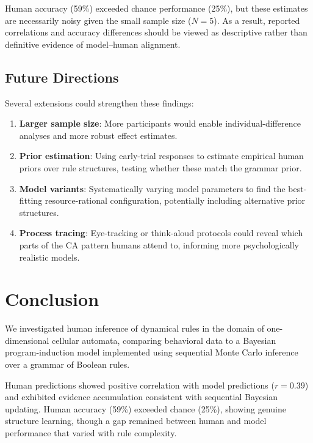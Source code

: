 \documentclass[10pt,letterpaper]{article}
\begin{document}
Human accuracy (59\%) exceeded chance performance (25\%), but these estimates are necessarily noisy given the small sample size ($N = 5$). As a result, reported correlations and accuracy differences should be viewed as descriptive rather than definitive evidence of model--human alignment.

\subsection{Future Directions}

Several extensions could strengthen these findings:

\begin{enumerate}
    \item \textbf{Larger sample size}: More participants would enable individual-difference analyses and more robust effect estimates.
    
    \item \textbf{Prior estimation}: Using early-trial responses to estimate empirical human priors over rule structures, testing whether these match the grammar prior.
    
    \item \textbf{Model variants}: Systematically varying model parameters to find the best-fitting resource-rational configuration, potentially including alternative prior structures.
    
    \item \textbf{Process tracing}: Eye-tracking or think-aloud protocols could reveal which parts of the CA pattern humans attend to, informing more psychologically realistic models.
\end{enumerate}


\section{Conclusion}

We investigated human inference of dynamical rules in the domain of one-dimensional cellular automata, comparing behavioral data to a Bayesian program-induction model implemented using sequential Monte Carlo inference over a grammar of Boolean rules.

Human predictions showed positive correlation with model predictions ($r = 0.39$) and exhibited evidence accumulation consistent with sequential Bayesian updating. Human accuracy (59\%) exceeded chance (25\%), showing genuine structure learning, though a gap remained between human and model performance that varied with rule complexity.
\end{document}
